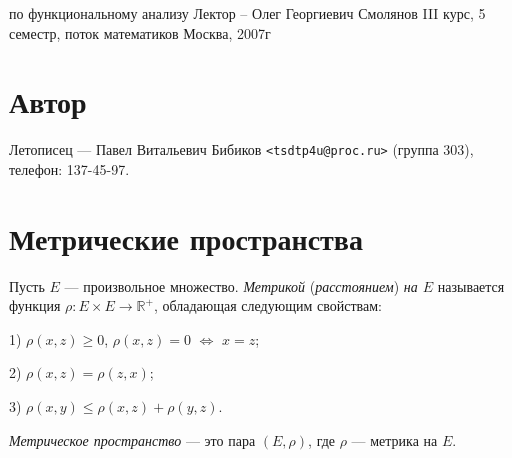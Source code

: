 \documentclass[10pt]{article}
\begin{document}
{ по функциональному анализу}
{Лектор -- Олег Георгиевич Смолянов}
{III курс, 5 семестр, поток математиков}
{Москва, 2007г}


\section*{Автор}
Летописец --- Павел Витальевич Бибиков {\normalfont \verb"<tsdtp4u@proc.ru>"}
(группа 303), телефон: 137-45-97.

\section{Метрические пространства}

\begin{df}
Пусть $E$ --- произвольное множество. \emph{Метрикой}
(\emph{расстоянием}) \emph{на $E$} называется функция $\rho\colon
E\times E\to \mathbb{R}^+$, обладающая следующим свойствам:

1) $\rho(x,z)\geqslant 0$, $\rho(x,z)=0$ $\Leftrightarrow$ $x=z$;

2) $\rho(x,z)=\rho(z,x)$;

3) $\rho(x,y)\leqslant\rho(x,z)+\rho(y,z)$.

\emph{Метрическое пространство} --- это пара $(E,\rho)$, где $\rho$
--- метрика на $E$.
\end{df}
\end{document}
